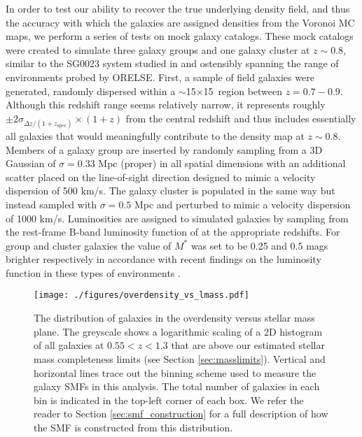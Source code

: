 \documentclass[a4paper,fleqn,usenatbib]{mnras}
\begin{document}
In order to test our ability to recover the true underlying density field, and thus the accuracy with which the galaxies are assigned densities from the Voronoi MC maps, we perform a series of tests on mock galaxy catalogs.
These mock catalogs were created to simulate three galaxy groups and one galaxy cluster at $z \sim 0.8$, similar to the SG0023 system studied in \citet{Lemaux2016arxiv} and ostensibly spanning the range of environments probed by ORELSE.
First, a sample of field galaxies were generated, randomly dispersed within a $\sim$15$\times$15\arcmin\ region between $z=0.7-0.9$.
Although this redshift range seems relatively narrow, it represents roughly $\pm 2 \sigma_{\Delta z / (1 + z_{\mathrm{spec}})} \times (1+z)$ from the central redshift and thus includes essentially all galaxies that would meaningfully contribute to the density map at $z \sim 0.8$.
Members of a galaxy group are inserted by randomly sampling from a 3D Gaussian of $\sigma = 0.33$ Mpc (proper) in all spatial dimensions with an additional scatter placed on the line-of-sight direction designed to mimic a velocity dispersion of 500 km/s.
The galaxy cluster is populated in the same way but instead sampled with $\sigma = 0.5$ Mpc and perturbed to mimic a velocity dispersion of 1000 km/s.
Luminosities are assigned to simulated galaxies by sampling from the rest-frame B-band luminosity function of \citet{Giallongo2005} at the appropriate redshifts.
For group and cluster galaxies the value of $M^*$ was set to be 0.25 and 0.5 mags brighter respectively in accordance with recent findings on the luminosity function in these types of environments \citep[e.g.][]{DePropris2013}.


\begin{figure*}
	\texttt{[image: ./figures/overdensity\_vs\_lmass.pdf]}
	\caption{
	The distribution of galaxies in the overdensity versus stellar mass plane.
	The greyscale shows a logarithmic scaling of a 2D histogram of all galaxies at $0.55 < z < 1.3$ that are above our estimated stellar mass completeness limits (see Section \ref{sec:masslimits}).
	Vertical and horizontal lines trace out the binning scheme used to measure the galaxy SMFs in this analysis.
	The total number of galaxies in each bin is indicated in the top-left corner of each box.
	We refer the reader to Section \ref{sec:smf_construction} for a full description of how the SMF is constructed from this distribution.
	}
	\label{fig:overdensity_mass}
\end{figure*}
\end{document}
